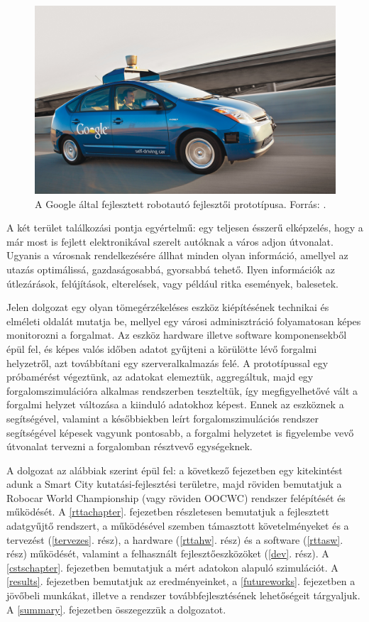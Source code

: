\documentclass[a4paper,12pt]{report}
\begin{document}
\begin{figure}[h]
\centerline{
\includegraphics[width=6in]{img/googleauto}}
\caption{A Google által fejlesztett robotautó fejlesztői prototípusa. Forrás: \cite{googlecarimage}.}
\label{googleauto}
\end{figure}

A két terület találkozási pontja egyértelmű: egy teljesen ésszerű elképzelés, hogy a már most is fejlett elektronikával szerelt autóknak a város adjon útvonalat. Ugyanis a városnak rendelkezésére állhat minden olyan információ, amellyel az utazás optimálissá, gazdaságosabbá, gyorsabbá tehető. Ilyen információk az útlezárások, felújítások, elterelések, vagy például ritka események, balesetek. 

Jelen dolgozat egy olyan tömegérzékeléses eszköz kiépítésének technikai és elméleti oldalát mutatja be, mellyel egy városi adminisztráció folyamatosan képes monitorozni a forgalmat. Az eszköz hardware illetve software komponensekből épül fel, és képes valós időben adatot gyűjteni a körülötte lévő forgalmi helyzetről, azt továbbítani egy szerveralkalmazás felé. A prototípussal egy próbamérést végeztünk, az adatokat elemeztük, aggregáltuk, majd egy forgalomszimulációra alkalmas rendszerben teszteltük, így megfigyelhetővé vált a forgalmi helyzet változása a kiinduló adatokhoz képest. Ennek az eszköznek a segítségével, valamint a későbbiekben leírt forgalomszimulációs rendszer segítségével képesek vagyunk pontosabb, a forgalmi helyzetet is figyelembe vevő útvonalat tervezni a forgalomban résztvevő egységeknek.

A dolgozat az alábbiak szerint épül fel: a következő fejezetben egy kitekintést adunk a Smart City kutatási-fejlesztési területre, majd röviden bemutatjuk a Robocar World Championship (vagy röviden OOCWC) rendszer felépítését és működését. A \ref{rttachapter}. fejezetben részletesen bemutatjuk a fejlesztett adatgyűjtő rendszert, a működésével szemben támasztott követelményeket és a tervezést (\ref{tervezes}. rész), a hardware (\ref{rttahw}. rész) és a software (\ref{rttasw}. rész) működését, valamint a felhasznált fejlesztőeszközöket (\ref{dev}. rész). A \ref{cstschapter}. fejezetben bemutatjuk a mért adatokon alapuló szimulációt. A \ref{results}. fejezetben bemutatjuk az eredményeinket, a \ref{futureworks}. fejezetben a jövőbeli munkákat, illetve a rendszer továbbfejlesztésének lehetőségeit tárgyaljuk.
A \ref{summary}. fejezetben összegezzük a dolgozatot.
\end{document}

